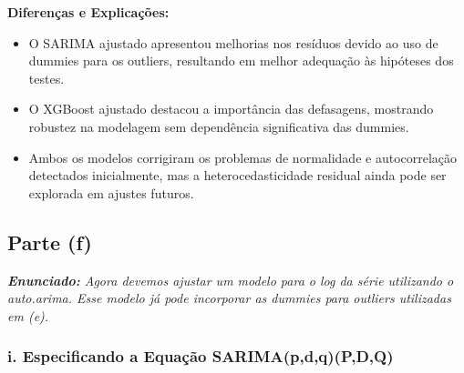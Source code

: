 \documentclass[a4paper, 12pt]{article}
\begin{document}
\begin{table}[H]
\centering
{}
\caption{Estatísticas de Aderência e Testes dos Resíduos}
\end{table}


\textbf{Diferenças e Explicações:}
\begin{itemize}
    \item O SARIMA ajustado apresentou melhorias nos resíduos devido ao uso de dummies para os outliers, resultando em melhor adequação às hipóteses dos testes.
    \item O XGBoost ajustado destacou a importância das defasagens, mostrando robustez na modelagem sem dependência significativa das dummies.
    \item Ambos os modelos corrigiram os problemas de normalidade e autocorrelação detectados inicialmente, mas a heterocedasticidade residual ainda pode ser explorada em ajustes futuros.
\end{itemize}



\subsection{Parte (f)}
\textit{\textbf{Enunciado:} Agora devemos ajustar um modelo para o log da série utilizando o auto.arima. Esse modelo já pode incorporar as dummies para outliers utilizadas em (e).}

\subsubsection{i. Especificando a Equação SARIMA(p,d,q)(P,D,Q)}\\
\end{document}

